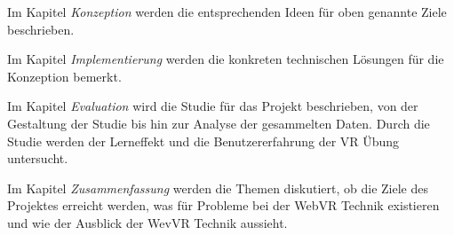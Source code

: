Im Kapitel {\em Konzeption} werden die entsprechenden Ideen für oben genannte Ziele beschrieben. 

Im Kapitel {\em Implementierung} werden die konkreten technischen Lösungen für die Konzeption bemerkt.

Im Kapitel {\em Evaluation} wird die Studie für das Projekt beschrieben, von der Gestaltung der Studie bis hin zur Analyse der gesammelten Daten. Durch die Studie werden der Lerneffekt und die Benutzererfahrung der VR Übung untersucht.

Im Kapitel {\em Zusammenfassung} werden die Themen diskutiert, ob die Ziele des Projektes erreicht werden, was für Probleme bei der WebVR Technik existieren und wie der Ausblick der WevVR Technik aussieht.